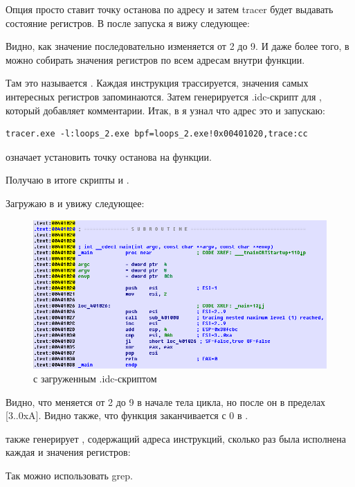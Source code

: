 Опция  просто ставит точку останова по адресу и затем tracer будет выдавать состояние регистров.
В  после запуска я вижу следующее:



Видно, как значение \ESI последовательно изменяется от 2 до 9.
И даже более того, в \tracer можно собирать значения регистров по всем адресам внутри функции.

Там это называется .
Каждая инструкция трассируется, значения самых интересных регистров запоминаются.
Затем генерируется .idc-скрипт для \IDA, который добавляет комментарии.
Итак, в \IDA я узнал что адрес \main это  и запускаю:

\begin{lstlisting}
tracer.exe -l:loops_2.exe bpf=loops_2.exe!0x00401020,trace:cc
\end{lstlisting}

 означает установить точку останова на функции.

Получаю в итоге скрипты  и .

\clearpage
Загружаю  в \IDA и увижу следующее:

\begin{figure}[H]
\centering
\includegraphics[scale=\FigScale]{patterns/09_loops/simple/IDA_tracer_cc.png}
\caption{\IDA с загруженным .idc-скриптом}
\label{fig:loops_IDA_tracer}
\end{figure}

Видно, что \ESI меняется от 2 до 9 в начале тела цикла, но после 
 он в пределах [3..0xA].
Видно также, что функция \main заканчивается с 0 в \EAX.

\tracer также генерирует , 
содержащий адреса инструкций, сколько раз была исполнена
каждая и значения регистров:


\myindex{\GrepUsage}
Так можно использовать grep.
